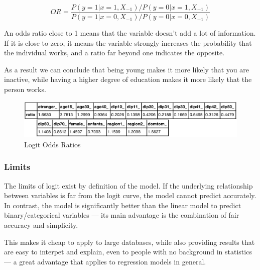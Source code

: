 \begin{equation}
OR = \frac{P(y=1|x=1, X_{-1})/P(y=0|x=1, X_{-1})}{P(y=1|x=0, X_{-1})/P(y=0|x=0, X_{-1})}
\end{equation}

An odds ratio close to 1 means that the variable doesn’t add a lot of information. If it is close to zero, it means the variable strongly increases the probability that the individual works, and a ratio far beyond one indicates the opposite.

As a result we can conclude that being young makes it more likely that you are inactive, while having a higher degree of education makes it more likely that the person works.

\begin{figure}
    \centering
    \includegraphics[scale=0.4]{img/logit_odds_ratios}
    \caption{Logit Odds Ratios}
    \label{fig:logit_odds_ratios}
\end{figure}




\subsubsection{Limits}
The limits of logit exist by definition of the model. If the underlying relationship between variables is far from the logit curve, the model cannot predict accurately. In contrast, the model is significantly better than the linear model to predict binary/categorical variables --- its main advantage is the combination of fair accuracy and simplicity.

This makes it cheap to apply to large databases, while also providing results that are easy to interpet and explain, even to people with no background in statistics --- a great advantage that applies to regression models in general.
